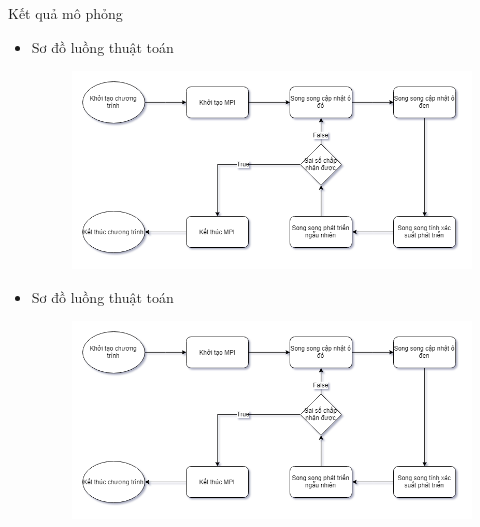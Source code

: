 \begin{frame}[allowframebreaks]{Kết quả mô phỏng}
\begin{itemize}
	\item Sơ đồ luồng thuật toán
    \begin{figure}[H]
        \centering
        \includegraphics[width=110mm]{img/algo-flowchart.png}
    \end{figure}
\end{itemize}
\break
\begin{itemize}
	\item Sơ đồ luồng thuật toán
    \begin{figure}[H]
        \centering
        \includegraphics[width=110mm]{img/algo-flowchart.png}
    \end{figure}
\end{itemize}
\end{frame}